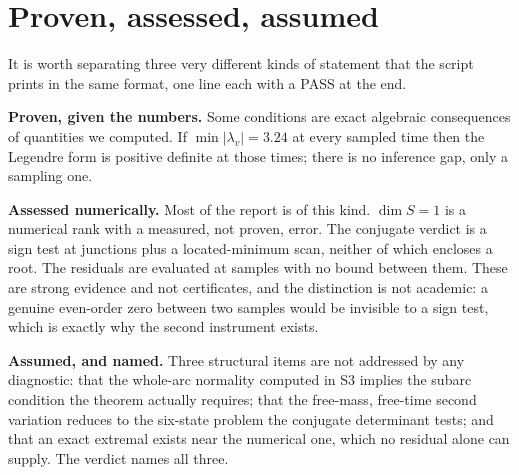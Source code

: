 \documentclass[11pt]{article}
\newcommand{\lv}{\lambda_v}\newcommand{\lr}{\lambda_r}\newcommand{\lm}{\lambda_m}
\begin{document}
\section{Proven, assessed, assumed}\label{sec:proves}

\begin{intu}
It is worth separating three very different kinds of statement that the script
prints in the same format, one line each with a PASS at the end.

\textbf{Proven, given the numbers.} Some conditions are exact algebraic
consequences of quantities we computed. If $\min|\lv| = 3.24$ at every sampled
time then the Legendre form is positive definite at those times; there is no
inference gap, only a sampling one.

\textbf{Assessed numerically.} Most of the report is of this kind. $\dim S = 1$
is a numerical rank with a measured, not proven, error. The conjugate verdict
is a sign test at junctions plus a located-minimum scan, neither of which
encloses a root. The residuals are evaluated at samples with no bound between
them. These are strong evidence and not certificates, and the distinction is
not academic: a genuine even-order zero between two samples would be invisible
to a sign test, which is exactly why the second instrument exists.

\textbf{Assumed, and named.} Three structural items are not addressed by any
diagnostic: that the whole-arc normality computed in S3 implies the subarc
condition the theorem actually requires; that the free-mass, free-time second
variation reduces to the six-state problem the conjugate determinant tests; and
that an exact extremal exists near the numerical one, which no residual alone
can supply. The verdict names all three.
\end{intu}
\end{document}
